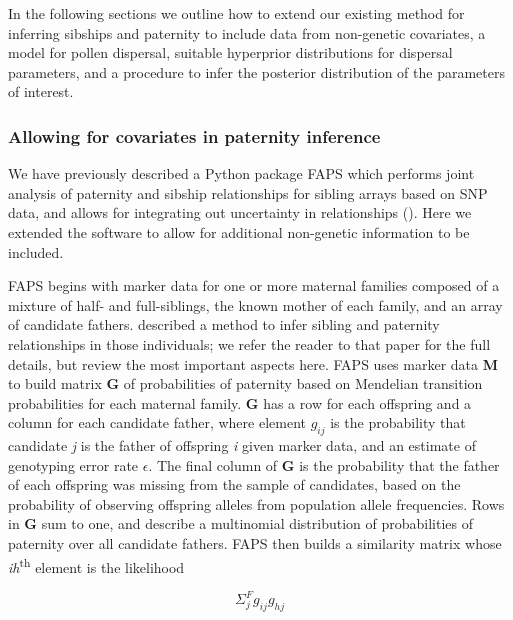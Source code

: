 \documentclass[10pt, a4paper, twocolumn]{article} %
\begin{document}
In the following sections we outline how to extend our existing method for inferring sibships and paternity to include data from non-genetic covariates, a model for pollen dispersal, suitable hyperprior distributions for dispersal parameters, and a procedure to infer the posterior distribution of the parameters of interest.

\subsubsection{Allowing for covariates in paternity inference}

We have previously described a Python package FAPS which performs joint analysis of paternity and sibship relationships for sibling arrays based on SNP data, and allows for integrating out uncertainty in relationships (\cite{ellis2018efficient}). Here we extended the software to allow for additional non-genetic information to be included.

FAPS begins with marker data for one or more maternal families composed of a mixture of half- and full-siblings, the known mother of each family, and an array of candidate fathers.
\textcite{ellis2018efficient} described a method to infer sibling and paternity relationships in those individuals; we refer the reader to that paper for the full details, but review the most important aspects here.
FAPS uses marker data \textbf{M} to build matrix \textbf{G} of probabilities of paternity based on Mendelian transition probabilities for each maternal family.
\textbf{G} has a row for each offspring and a column for each candidate father, where element $g_{ij}$ is the probability that candidate \textit{j} is the father of offspring \textit{i} given marker data, and an estimate of genotyping error rate $\epsilon$. 
The final column of \textbf{G} is the probability that the father of each offspring was missing from the sample of candidates, based on the probability of observing offspring alleles from population allele frequencies.
Rows in \textbf{G} sum to one, and describe a multinomial distribution of probabilities of paternity over all candidate fathers. FAPS then builds a similarity matrix whose \textit{ih}\textsuperscript{th} element is the likelihood

\begin{equation}\label{eqn:faps_similarity_matrix}
    \Sigma_j^F g_{ij}g_{hj}
\end{equation}
\end{document}
